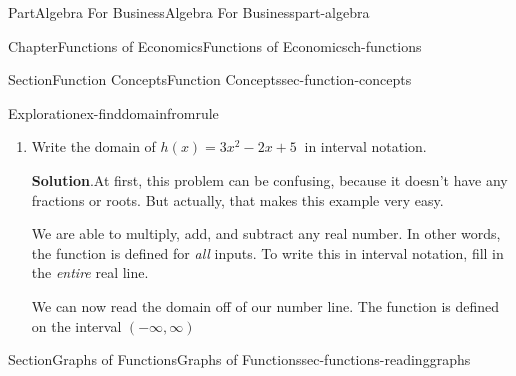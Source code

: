 \documentclass{tufte-book}
\newcommand{\blocktitlefont}{\relax}
\numberwithin{equation}{chapter}
\begin{document}
\begin{partptx}{Part}{Algebra For Business}{}{Algebra For Business}{}{}{part-algebra}
\begin{chapterptx}{Chapter}{Functions of Economics}{}{Functions of Economics}{}{}{ch-functions}
\begin{sectionptx}{Section}{Function Concepts}{}{Function Concepts}{}{}{sec-function-concepts}
\begin{exploration}{Exploration}{}{ex-finddomainfromrule}
\begin{enumerate}[font=\bfseries,label=(\alph*),ref=\alph*]
\par
That means that the fraction \(\sqrt{x}\) is defined if and only if the inside \(x \geq 0\).%
\par
To write this in interval notation, draw the points where the function \emph{is} defined on a number line. Use a closed circle at \(x=0\) to \emph{include} that value, and draw a thick line to the right to include all positive numbers.%
\begin{image}{0.25}{0.5}{0.25}{}%
%
\end{image}%
We can now read the domain off of our number line. The function is defined on the interval \([0,\infty)\)%
\item{}Write the domain of \(h(x) = 3x^2 - 2x + 5\ \) in interval notation.%
\par\smallskip%
\noindent\textbf{\blocktitlefont Solution}.\hypertarget{ex-finddomainfromrule-3-2}{}\quad{}At first, this problem can be confusing, because it doesn't have any fractions or roots. But actually, that makes this example very easy.%
\par
We are able to multiply, add, and subtract any real number. In other words, the function is defined for \emph{all} inputs. To write this in interval notation, fill in the \emph{entire} real line.%
\begin{image}{0.25}{0.5}{0.25}{}%
%
\end{image}%
We can now read the domain off of our number line. The function is defined on the interval \((-\infty,\infty)\)%
\end{enumerate}%
\end{exploration}%
\end{sectionptx}
%
%
\typeout{************************************************}
\typeout{************************************************}
%
\begin{sectionptx}{Section}{Graphs of Functions}{}{Graphs of Functions}{}{}{sec-functions-readinggraphs}

\end{sectionptx}
\end{chapterptx}
\end{partptx}
\end{document}
